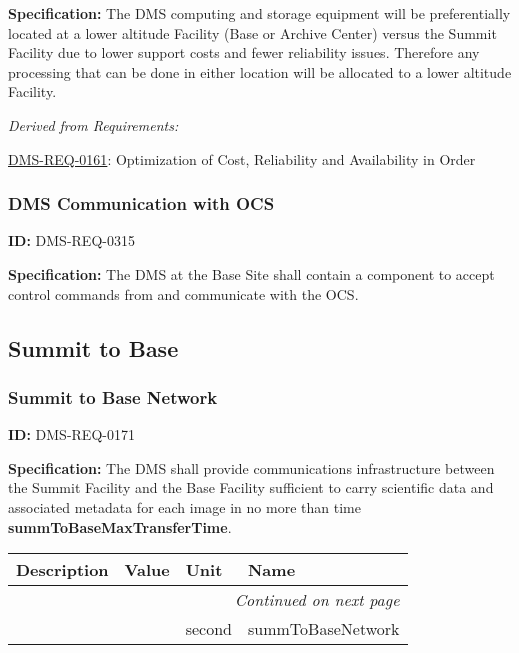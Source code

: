 \documentclass[SE,toc,lsstdraft]{lsstdoc}
\makeatletter
\newcommand{\paramname}[1]{\hspace{0pt}#1}
\newcommand{\unitname}[1]{\hspace{0pt}#1}
\newenvironment{parameters}[0]{%
\setlength\LTleft{0pt}
\setlength\LTright{\fill}
\begin{small}
\begin{longtable}[]{|p{0.5\textwidth}|l|p{0.6in}|p{1.74in}@{}|}

\hline \textbf{Description} & \textbf{Value} & \textbf{Unit} & \textbf{Name} \\ \hline
\endhead

\hline \multicolumn{4}{r}{\emph{Continued on next page}} \\
\endfoot

\hline\hline
\endlastfoot
}{%
\hline
\end{longtable}
\end{small}
}
\makeatother
\begin{document}
\textbf{Specification: }The DMS computing and storage equipment will be preferentially located at a lower altitude Facility (Base or Archive Center) versus the Summit Facility due to lower support costs and fewer reliability issues. Therefore any processing that can be done in either location will be allocated to a lower altitude Facility.






\emph{Derived from Requirements:}

\hyperref[DMS-REQ-0161]{DMS-REQ-0161}:
Optimization of Cost, Reliability and Availability in Order \newline


\subsubsection{DMS Communication with OCS}

\label{DMS-REQ-0315}
\textbf{ID:} DMS-REQ-0315

\textbf{Specification:} The DMS at the Base Site shall contain a component to accept control commands from and communicate with the OCS.






\subsection{Summit to Base}





\subsubsection{Summit to Base Network}

\label{DMS-REQ-0171}
\textbf{ID:} DMS-REQ-0171

\textbf{Specification:} The DMS shall provide communications infrastructure between the Summit Facility and the Base Facility sufficient to carry scientific data and associated metadata for each image in no more than time \textbf{summToBaseMaxTransferTime}.





\begin{parameters}

&

&
\unitname{%
second
}
&
\paramname{%
summToBaseNetwork
} \\\hline
\end{parameters}
\end{document}
